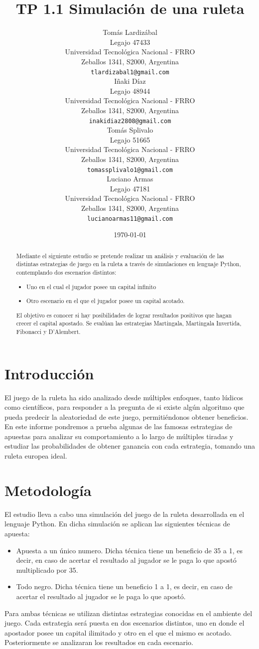 \documentclass{article}
\title{TP 1.1 Simulación de una ruleta}
\author{
 Tomás Lardizábal \\
  Legajo 47433\\
  Universidad Tecnológica Nacional - FRRO\\
  Zeballos 1341, S2000, Argentina \\
  \texttt{tlardizabal1@gmail.com} \\
   \And
 Iñaki Díaz\\
  Legajo 48944\\
  Universidad Tecnológica Nacional - FRRO\\
  Zeballos 1341, S2000, Argentina \\
  \texttt{inakidiaz2808@gmail.com} \\
    \And
 Tomás Splivalo\\
  Legajo 51665 \\
  Universidad Tecnológica Nacional - FRRO\\
  Zeballos 1341, S2000, Argentina \\
  \texttt{tomassplivalo1@gmail.com} \\
    \And
 Luciano Armas\\
  Legajo 47181\\
  Universidad Tecnológica Nacional - FRRO\\
  Zeballos 1341, S2000, Argentina \\
  \texttt{lucianoarmas11@gmail.com} \\
}
\date{\today}
\begin{document}
\maketitle

\pagestyle{fancy}
\fancyhead{} %

\begin{abstract}
Mediante el siguiente estudio se pretende realizar un análisis y evaluación de las distintas estrategias de juego en la ruleta a través de simulaciones en lenguaje Python, contemplando dos escenarios distintos: 
\begin{itemize}
  \item Uno en el cual el jugador posee un capital infinito
  \item Otro escenario en el que el jugador posee un capital acotado.
\end{itemize}
 El objetivo es conocer si hay posibilidades de lograr resultados positivos que hagan crecer el capital apostado.
Se evalúan las estrategias Martingala, Martingala Invertida, Fibonacci y D'Alembert.
\end{abstract}


\section{Introducción}
El juego de la ruleta ha sido analizado desde múltiples enfoques, tanto lúdicos como científicos, para responder a la pregunta de si existe algún algoritmo que pueda predecir la aleatoriedad de este juego, permitiéndonos obtener beneficios.
En este informe pondremos a prueba algunas de las famosas estrategias de apuestas para analizar su comportamiento a lo largo de múltiples tiradas y estudiar las probabilidades de obtener ganancia con cada estrategia, tomando una ruleta europea ideal.




\section{Metodología}
El estudio lleva a cabo una simulación del juego de la ruleta desarrollada en el lenguaje Python. En dicha simulación se aplican las siguientes técnicas de apuesta:
\begin{itemize}
  \item Apuesta a un único numero. Dicha técnica tiene un beneficio de 35 a 1, es decir, en caso de acertar el resultado al jugador se le paga lo que apostó multiplicado por 35.
  \item Todo negro. Dicha técnica tiene un beneficio 1 a 1, es decir, en caso de acertar el resultado al jugador se le paga lo que apostó.
\end{itemize} 
Para ambas técnicas se utilizan distintas estrategias conocidas en el ambiente del juego.
Cada estrategia será puesta en dos escenarios distintos, uno en donde el apostador posee un capital ilimitado y otro en el que el mismo es acotado. Posteriormente se analizaran los resultados en cada escenario.
\end{document}

